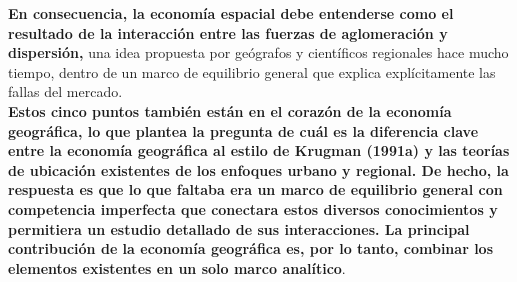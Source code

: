 \textbf{En consecuencia, la economía espacial debe entenderse como el resultado de la interacción entre las fuerzas de aglomeración y dispersión,} una idea propuesta por geógrafos y científicos regionales hace mucho tiempo, dentro de un marco de equilibrio general que explica explícitamente las fallas del mercado.\\
\textbf{Estos cinco puntos también están en el corazón de la economía geográfica, lo que plantea la pregunta de cuál es la diferencia clave entre la economía geográfica al estilo de Krugman (1991a) y las teorías de ubicación existentes de los enfoques urbano y regional.  De hecho, la respuesta es que lo que faltaba era un marco de equilibrio general con competencia imperfecta que conectara estos diversos conocimientos y permitiera un estudio detallado de sus interacciones. La principal contribución de la economía geográfica es, por lo tanto, combinar los elementos existentes en un solo marco analítico}. 

